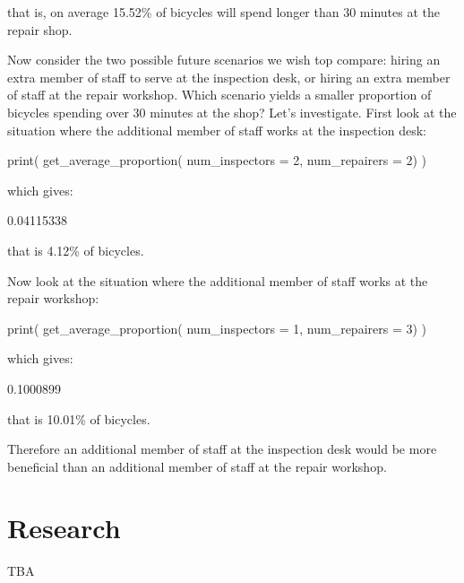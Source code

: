 that is, on average 15.52\% of bicycles will spend longer than 30 minutes at the
repair shop.

Now consider the two possible future scenarios we wish top compare: hiring an
extra member of staff to serve at the inspection desk, or hiring an extra member
of staff at the repair workshop. Which scenario yields a smaller proportion of
bicycles spending over 30 minutes at the shop? Let's investigate. First look at
the situation where the additional member of staff works at the inspection desk:

\begin{Rin}
print(
  get_average_proportion(
    num_inspectors = 2,
    num_repairers = 2)
)
\end{Rin}

which gives:

\begin{Rout}
[1] 0.04115338
\end{Rout}

that is 4.12\% of bicycles.

Now look at the situation where the additional member of staff works at the
repair workshop:

\begin{Rin}
print(
  get_average_proportion(
    num_inspectors = 1,
    num_repairers = 3)
)
\end{Rin}

which gives:

\begin{Rout}
[1] 0.1000899
\end{Rout}

that is 10.01\% of bicycles.

Therefore an additional member of staff at the inspection desk would be more
beneficial than an additional member of staff at the repair workshop.


\section{Research}\label{sec:research}

TBA
